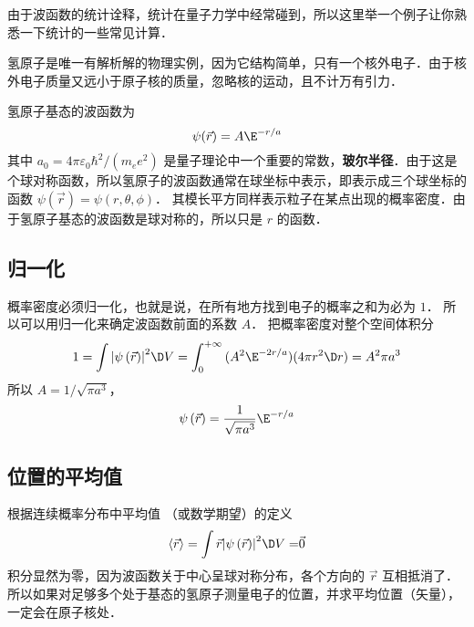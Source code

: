 

由于波函数的统计诠释，统计在量子力学中经常碰到，所以这里举一个例子让你熟悉一下统计的一些常见计算．

氢原子是唯一有解析解的物理实例，因为它结构简单，只有一个核外电子．由于核外电子质量又远小于原子核的质量，忽略核的运动，且不计万有引力．

氢原子基态的波函数为
\begin{equation}
\psi(\vec r) = A\E^{-r/a}
\end{equation}
其中 ${a_0} = {{4\pi {\varepsilon _0}{\hbar ^2}}}/({{{m_e}{e^2}}})$ 是量子理论中一个重要的常数，\textbf{玻尔半径}．由于这是个球对称函数，所以氢原子的波函数通常在球坐标中表示，即表示成三个球坐标的函数 $\psi \left( {\vec r} \right) = \psi \left( {r,\theta ,\phi } \right)$． 其模长平方同样表示粒子在某点出现的概率密度．由于氢原子基态的波函数是球对称的，所以只是 $r$ 的函数．

\subsection{归一化}
  
概率密度必须归一化，也就是说，在所有地方找到电子的概率之和为必为 $1$． 所以可以用归一化来确定波函数前面的系数 $A$． 把概率密度对整个空间体积分
\begin{equation}
    1 = \int {{{\left| {\psi \left( {\vec r} \right)} \right|}^2} \D V}  = \int_0^{ + \infty } {(A^2 \E^{-2r/a})(4\pi r^2\D r)}  = {A^2}\pi {a^3}
\end{equation}
所以 $A = {1}/{{\sqrt {\pi {a^3}} }}$， 
\begin{equation}
\psi \left( {\vec r} \right) = \frac{1}{{\sqrt {\pi {a^3}} }}{\E^{-r/a}}
\end{equation}

\subsection{位置的平均值}

 根据连续概率分布中平均值%
（或数学期望）的定义
\begin{equation}
\left\langle {\vec r} \right\rangle  = \int {\vec r{{\left| {\psi \left( {\vec r} \right)} \right|}^2} \D V = } \vec 0
\end{equation}
积分显然为零，因为波函数关于中心呈球对称分布，各个方向的 $\vec r$ 互相抵消了．所以如果对足够多个处于基态的氢原子测量电子的位置，并求平均位置（矢量）， 一定会在原子核处．

